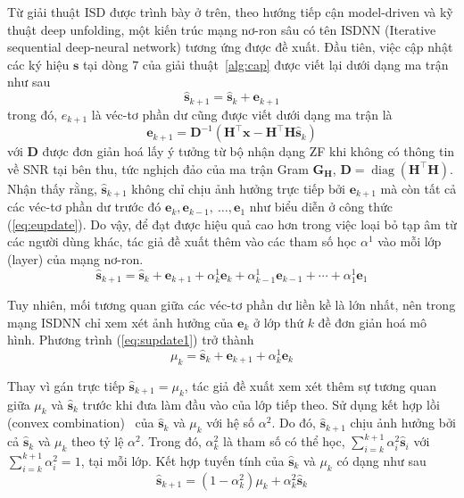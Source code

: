 Từ giải thuật ISD được trình bày ở trên, theo hướng tiếp cận model-driven và kỹ thuật deep unfolding, một kiến trúc mạng nơ-ron sâu có tên ISDNN (Iterative sequential deep-neural network) tương ứng được đề xuất. Đầu tiên, việc cập nhật các ký hiệu $\mathbf{s}$ tại dòng $7$ của giải thuật~\ref{alg:cap} được viết lại dưới dạng ma trận như sau
\begin{equation}
\hat{\mathbf{s}}_{k+1}=\hat{\mathbf{s}}_k+\mathbf{e}_{k+1}
\end{equation}
trong đó, $e_{k+1}$ là véc-tơ phần dư cũng được viết dưới dạng ma trận là
\begin{equation}
    \mathbf{e}_{k+1}=\mathbf{D}^{-1}\left(\mathbf{H}^\top \mathbf{x}-\mathbf{H}^\top \mathbf{H} \hat{\mathbf{s}}_k\right)
\end{equation}
với $\mathbf{D}$ được đơn giản hoá lấy ý tưởng từ bộ nhận dạng ZF khi không có thông tin về SNR tại bên thu, tức nghịch đảo của ma trận Gram $\mathbf{G}_\mathbf{H}$, $\mathbf{D} = \operatorname{diag}(\mathbf{H}^\top \mathbf{H})$. 
Nhận thấy rằng, $\hat{\mathbf{s}}_{k+1}$ không chỉ chịu ảnh hưởng trực tiếp bởi $\mathbf{e}_{k+1}$ mà còn tất cả các véc-tơ phần dư trước đó $\mathbf{e}_{k}, \mathbf{e}_{k-1},~\ldots, \mathbf{e}_{1}$ như biểu diễn ở công thức (\ref{eq:eupdate}). Do vậy, để đạt được hiệu quả cao hơn trong việc loại bỏ tạp âm từ các người dùng khác, tác giả đề xuất thêm vào các tham số học $\alpha^1$ vào mỗi lớp (layer) của mạng nơ-ron.
\begin{equation}
\label{eq:supdate1}
\hat{\mathbf{s}}_{k+1}=\hat{\mathbf{s}}_k+\mathbf{e}_{k+1}+\alpha_k^{1} \mathbf{e}_k+\alpha_{k-1}^{1} \mathbf{e}_{k-1}+\cdots+\alpha_1^{1} \mathbf{e}_1
\end{equation}

Tuy nhiên, mối tương quan giữa các véc-tơ phần dư liền kề là lớn nhất, nên trong mạng ISDNN chỉ xem xét ảnh hưởng của $\mathbf{e}_k$ ở lớp thứ $k$ đề đơn giản hoá mô hình. Phương trình (\ref{eq:supdate1}) trở thành 
\begin{equation}
\mu_{k}=\hat{\mathbf{s}}_k+\mathbf{e}_{k+1}+\alpha_k^1 \mathbf{e}_k
\end{equation}

Thay vì gán trực tiếp $\hat{\mathbf{s}}_{k+1} = \mu_k$, tác giả đề xuất xem xét thêm sự tương quan giữa $\mu_k$ và $\hat{\mathbf{s}}_k$ trước khi đưa làm đầu vào của lớp tiếp theo. Sử dụng kết hợp lồi (convex combination)~\cite{hammad2023} của $\hat{\mathbf{s}}_k$ và $\mu_k$ với hệ số $\alpha^2$. Do đó, $\hat{\mathbf{s}}_{k+1}$ chịu ảnh hưởng bởi cả $\hat{\mathbf{s}}_k$ và $\mu_k$ theo tỷ lệ $\alpha^2$. 
Trong đó, $\alpha^2_k$ là tham số có thể học, $\sum_{i=k}^{k+1} \alpha_i^{2} \hat{\mathbf{s}}_i$ với $\sum_{i=k}^{k+1} \alpha_i^{2}=1$, tại mỗi lớp. Kết hợp tuyến tính của $\hat{\mathbf{s}}_k$ và $\mu_k$ có dạng như sau
\begin{equation}
\hat{\mathbf{s}}_{k+1}=\left(1-\alpha_k^2\right) \mu_k + \alpha_k^2 \hat{\mathbf{s}}_k
\end{equation}

